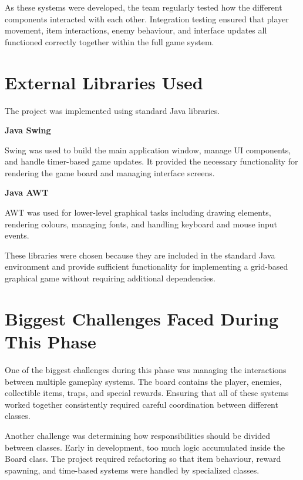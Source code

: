 \documentclass[12pt]{article}
\begin{document}
As these systems were developed, the team regularly tested how the different components interacted with each other. Integration testing ensured that player movement, item interactions, enemy behaviour, and interface updates all functioned correctly together within the full game system.

\section{External Libraries Used}

The project was implemented using standard Java libraries.

\textbf{Java Swing}

Swing was used to build the main application window, manage UI components, and handle timer-based game updates. It provided the necessary functionality for rendering the game board and managing interface screens.

\textbf{Java AWT}

AWT was used for lower-level graphical tasks including drawing elements, rendering colours, managing fonts, and handling keyboard and mouse input events.

These libraries were chosen because they are included in the standard Java environment and provide sufficient functionality for implementing a grid-based graphical game without requiring additional dependencies.

\section{Biggest Challenges Faced During This Phase}

One of the biggest challenges during this phase was managing the interactions between multiple gameplay systems. The board contains the player, enemies, collectible items, traps, and special rewards. Ensuring that all of these systems worked together consistently required careful coordination between different classes.

Another challenge was determining how responsibilities should be divided between classes. Early in development, too much logic accumulated inside the Board class. The project required refactoring so that item behaviour, reward spawning, and time-based systems were handled by specialized classes.
\end{document}
